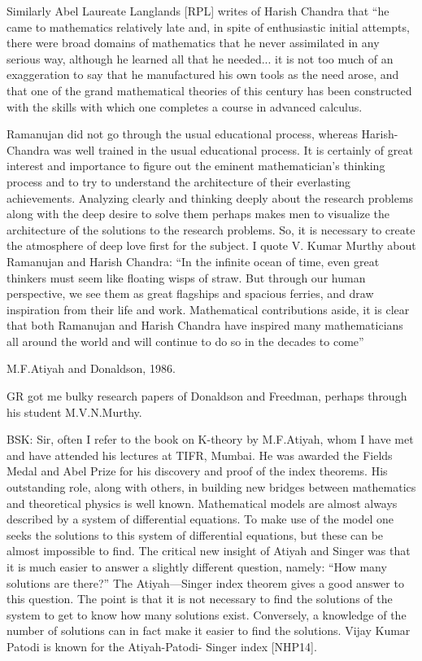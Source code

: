  Similarly Abel Laureate Langlands [RPL] writes of Harish Chandra that “he came to mathematics relatively late and, in spite of enthusiastic initial attempts, there were broad domains of mathematics that he never assimilated in any serious way, although he learned all that he needed... it is not too much of an exaggeration to say that he manufactured his own tools as the need arose, and that one of the grand mathematical theories of this century has been constructed with the skills with which one completes a course in advanced calculus.
 
 Ramanujan did not go through the usual educational process, whereas Harish-Chandra was well trained in the usual educational process.  It is certainly of great interest and importance to figure out the eminent mathematician’s thinking process and to try to understand the architecture of their everlasting achievements. Analyzing clearly and thinking deeply about the research problems along with the deep desire to solve them perhaps makes men to visualize the architecture of the solutions to the research problems. So, it is necessary to create the atmosphere of deep love first for the subject.  I quote V. Kumar Murthy about Ramanujan and Harish Chandra: “In the infinite ocean of time, even great thinkers must seem like floating wisps of straw. But through our human perspective, we see them as great flagships and spacious ferries, and draw inspiration from their life and work. Mathematical contributions aside, it is clear that both Ramanujan and Harish Chandra have inspired many mathematicians all around the world and will continue to do so in the decades to come”
 
  M.F.Atiyah and Donaldson, 1986.
  
  GR got me bulky research papers of Donaldson and Freedman, perhaps through his student M.V.N.Murthy.
  
BSK:   Sir, often I refer to the book on K-theory by M.F.Atiyah, whom I have met  and have attended his lectures at TIFR, Mumbai. He was awarded the Fields Medal and Abel Prize for his discovery and proof of the index theorems. His outstanding role, along with others, in building new bridges between mathematics and theoretical physics is well known. Mathematical models are almost always described by a system of differential equations. To make use of the model one seeks the solutions to this system of differential equations, but these can be almost impossible to find. The critical new insight of Atiyah and Singer was that it is much easier to answer a slightly different question, namely: “How many solutions are there?” The Atiyah—Singer index theorem gives a good answer to this question. The point is that it is not necessary to find the solutions of the system to get to know how many solutions exist. Conversely, a knowledge of the number of solutions can in fact make it easier to find the solutions. Vijay Kumar Patodi is known for the Atiyah-Patodi- Singer index [NHP14].

